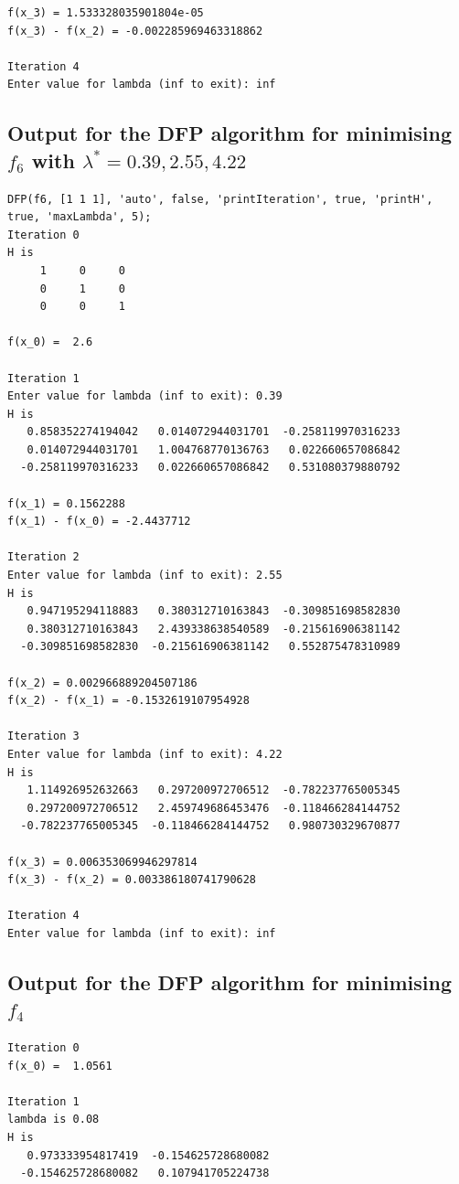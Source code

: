 \documentclass[11pt]{article} %
\begin{document}
\begin{appendices}
\begin{verbatim}
f(x_3) = 1.533328035901804e-05
f(x_3) - f(x_2) = -0.002285969463318862
 
Iteration 4
Enter value for lambda (inf to exit): inf
\end{verbatim}
\subsection{Output for the DFP algorithm for minimising $f_6$ with $\lambda^* = 0.39, 2.55, 4.22$}
\label{app:DFP_out_3}
\begin{verbatim}
DFP(f6, [1 1 1], 'auto', false, 'printIteration', true, 'printH', true, 'maxLambda', 5);
Iteration 0
H is
     1     0     0
     0     1     0
     0     0     1

f(x_0) =  2.6
 
Iteration 1
Enter value for lambda (inf to exit): 0.39
H is
   0.858352274194042   0.014072944031701  -0.258119970316233
   0.014072944031701   1.004768770136763   0.022660657086842
  -0.258119970316233   0.022660657086842   0.531080379880792

f(x_1) = 0.1562288
f(x_1) - f(x_0) = -2.4437712
 
Iteration 2
Enter value for lambda (inf to exit): 2.55
H is
   0.947195294118883   0.380312710163843  -0.309851698582830
   0.380312710163843   2.439338638540589  -0.215616906381142
  -0.309851698582830  -0.215616906381142   0.552875478310989

f(x_2) = 0.002966889204507186
f(x_2) - f(x_1) = -0.1532619107954928
 
Iteration 3
Enter value for lambda (inf to exit): 4.22
H is
   1.114926952632663   0.297200972706512  -0.782237765005345
   0.297200972706512   2.459749686453476  -0.118466284144752
  -0.782237765005345  -0.118466284144752   0.980730329670877

f(x_3) = 0.006353069946297814
f(x_3) - f(x_2) = 0.003386180741790628
 
Iteration 4
Enter value for lambda (inf to exit): inf
\end{verbatim}

\subsection{Output for the DFP algorithm for minimising $f_4$}
\label{app:DFP_out_4}
\begin{verbatim}
Iteration 0
f(x_0) =  1.0561
 
Iteration 1
lambda is 0.08
H is
   0.973333954817419  -0.154625728680082
  -0.154625728680082   0.107941705224738


\end{verbatim}
\end{appendices}
\end{document}
